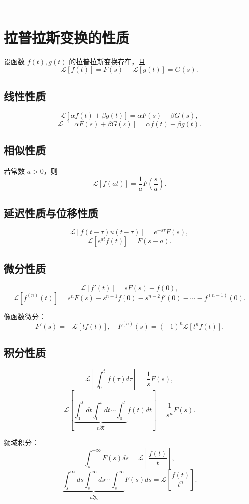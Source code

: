 ---

\section{拉普拉斯变换的性质}
设函数 \( f(t),g(t) \) 的拉普拉斯变换存在，且
\[
\mathscr{L}[f(t)]=F(s),\quad \mathscr{L}[g(t)]=G(s).
\]

\subsection{线性性质}
\[
\mathscr{L}\left[\alpha f(t)+\beta g(t)\right] = \alpha F(s)+\beta G(s),
\]
\[
\mathscr{L}^{-1}\left[\alpha F(s)+\beta G(s)\right] = \alpha f(t)+\beta g(t).
\]

\subsection{相似性质}
若常数 \( a>0 \)，则
\[
\mathscr{L}[f(at)] = \frac{1}{a}F\left(\frac{s}{a}\right).
\]

\subsection{延迟性质与位移性质}
\[
\mathscr{L}\left[f(t-\tau)u(t-\tau)\right] = e^{-s\tau}F(s),
\]
\[
\mathscr{L}\left[e^{at}f(t)\right] = F(s-a).
\]

\subsection{微分性质}
\[
\mathscr{L}\left[f'(t)\right] = sF(s)-f(0),
\]
\[
\mathscr{L}\left[f^{(n)}(t)\right] = s^nF(s)-s^{n-1}f(0)-s^{n-2}f'(0)-\cdots-f^{(n-1)}(0).
\]

像函数微分：
\[
F'(s) = -\mathscr{L}\left[tf(t)\right],\quad
F^{(n)}(s) = (-1)^n\mathscr{L}\left[t^n f(t)\right].
\]

\subsection{积分性质}
\[
\mathscr{L}\left[\int_0^t f(\tau)d\tau\right] = \frac{1}{s}F(s),
\]
\[
\mathscr{L}\left[\underbrace{\int_0^t dt\int_0^t dt\cdots\int_0^t}_{n\text{次}} f(t)dt\right] = \frac{1}{s^n}F(s).
\]

频域积分：
\[
\int_s^{+\infty} F(s)ds = \mathscr{L}\left[\frac{f(t)}{t}\right],
\]
\[
\underbrace{\int_s^\infty ds\int_s^\infty ds\cdots\int_s^\infty}_{n\text{次}} F(s)ds = \mathscr{L}\left[\frac{f(t)}{t^n}\right].
\]

